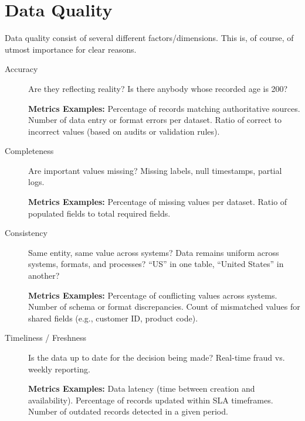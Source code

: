 \section{Data Quality}
\label{sec:Data_Quality}

Data quality consist of several different factors/dimensions.
This is, of course, of utmost importance for clear reasons.

\begin{description}
\item [Accuracy] Are they reflecting reality? Is there anybody whose recorded age is 200?

{\bf \color{red} Metrics Examples:} Percentage of records matching authoritative sources.
Number of data entry or format errors per dataset.
Ratio of correct to incorrect values (based on audits or validation rules).

\item [Completeness] Are important values missing? 
Missing labels, null timestamps, partial logs. 

{\bf \color{red} Metrics Examples:} Percentage of missing values per dataset.
Ratio of populated fields to total required fields.

\item [Consistency] Same entity, same value across systems?
Data remains uniform across systems, formats, and processes?
``US'' in one table, ``United States'' in another?

{\bf \color{red} Metrics Examples:} Percentage of conflicting values across systems.
Number of schema or format discrepancies.
Count of mismatched values for shared fields (e.g., customer ID, product code).

\item [Timeliness / Freshness] 
Is the data up to date for the decision being made?
Real-time fraud vs. weekly reporting.

{\bf \color{red} Metrics Examples:} 
Data latency (time between creation and availability).
Percentage of records updated within SLA timeframes.
Number of outdated records detected in a given period.


\end{description}
